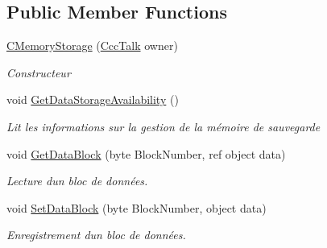 \subsection*{Public Member Functions}
\begin{DoxyCompactItemize}
\item 
\mbox{\hyperlink{class_device_library_1_1_c_memory_storage_a1f469e7acead36a0223f798f5a2d9de9}{C\+Memory\+Storage}} (\mbox{\hyperlink{class_device_library_1_1_ccc_talk}{Ccc\+Talk}} owner)
\begin{DoxyCompactList}\small\item\em Constructeur \end{DoxyCompactList}\item 
void \mbox{\hyperlink{class_device_library_1_1_c_memory_storage_af329c7962b7095cc2f15dd5a22d0fcfd}{Get\+Data\+Storage\+Availability}} ()
\begin{DoxyCompactList}\small\item\em Lit les informations sur la gestion de la mémoire de sauvegarde \end{DoxyCompactList}\item 
void \mbox{\hyperlink{class_device_library_1_1_c_memory_storage_a7517e6ae450e6c26be181fa187d98ed0}{Get\+Data\+Block}} (byte Block\+Number, ref object data)
\begin{DoxyCompactList}\small\item\em Lecture d\textquotesingle{}un bloc de données. \end{DoxyCompactList}\item 
void \mbox{\hyperlink{class_device_library_1_1_c_memory_storage_a8220a45c5b071e142269665113554702}{Set\+Data\+Block}} (byte Block\+Number, object data)
\begin{DoxyCompactList}\small\item\em Enregistrement d\textquotesingle{}un bloc de données. \end{DoxyCompactList}\end{DoxyCompactItemize}
